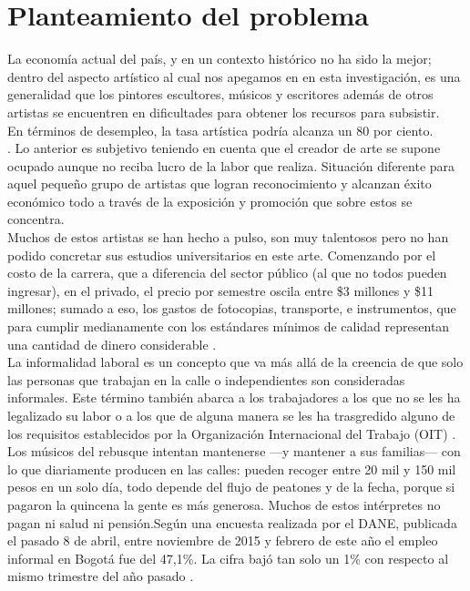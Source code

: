 \section{Planteamiento del problema}

La economía actual del país, y en un contexto histórico no ha sido la mejor; dentro del aspecto artístico al cual nos apegamos en en esta investigación, es una generalidad que los pintores escultores, músicos y escritores además de otros artistas se encuentren en dificultades para obtener los recursos para subsistir.\\
En términos de desempleo, la tasa artística podría alcanza un 80 por ciento.\\. Lo anterior es subjetivo teniendo en cuenta que el creador de arte se supone ocupado aunque no reciba lucro de la labor que realiza. Situación diferente para aquel pequeño grupo de artistas que logran reconocimiento y alcanzan éxito económico todo a través de la exposición y promoción que sobre estos se concentra.\\
 
Muchos de estos artistas se han hecho a pulso, son muy talentosos pero no han podido concretar sus estudios universitarios en este arte. Comenzando por el costo de la carrera, que a diferencia del sector público (al que no todos pueden ingresar), en el privado, el precio por semestre oscila entre \$3 millones y \$11 millones; sumado a eso, los gastos de fotocopias, transporte, e instrumentos, que para cumplir medianamente con los estándares mínimos de calidad representan una cantidad de dinero considerable .\\

La informalidad laboral es un concepto que va más allá de la creencia de que solo las personas que trabajan en la calle o independientes son consideradas informales. Este término también abarca a los trabajadores a los que no se les ha legalizado su labor o a los que de alguna manera se les ha trasgredido alguno de los requisitos establecidos por la Organización Internacional del Trabajo (OIT) .\\

Los músicos del rebusque intentan mantenerse —y mantener a sus familias— con lo que diariamente producen en las calles: pueden recoger entre 20 mil y 150 mil pesos en un solo día, todo depende del flujo de peatones y de la fecha, porque si pagaron la quincena la gente es más generosa. Muchos de estos intérpretes no pagan ni salud ni pensión.Según una encuesta realizada por el DANE, publicada el pasado 8 de abril, entre noviembre de 2015 y febrero de este año el empleo informal en Bogotá fue del 47,1\%. La cifra bajó tan solo un 1\% con respecto al mismo trimestre del año pasado .\\

